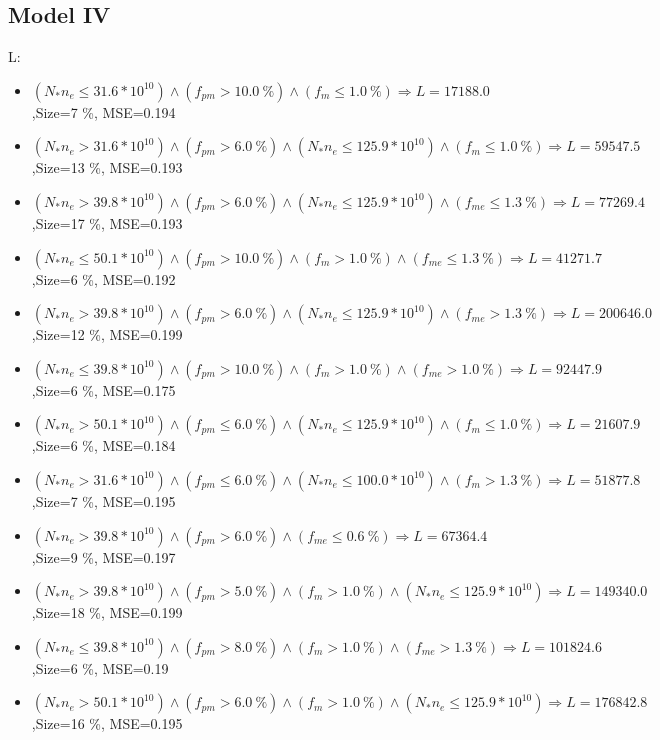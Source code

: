 \documentclass[numbered]{CSL}
\begin{document}
\subsection{Model IV}
L:
\begin{itemize}
\item $(N_* n_e \leq 31.6 * 10^{10}) \land (f_{pm} > 10.0~\%) \land (f_m \leq 1.0~\%) \Rightarrow L = 17188.0$,\hfill Size=7 \%, MSE=0.194
\item $(N_* n_e > 31.6 * 10^{10}) \land (f_{pm} > 6.0~\%) \land (N_* n_e \leq 125.9 * 10^{10}) \land (f_m \leq 1.0~\%) \Rightarrow L = 59547.5$,\hfill Size=13 \%, MSE=0.193
\item $(N_* n_e > 39.8 * 10^{10}) \land (f_{pm} > 6.0~\%) \land (N_* n_e \leq 125.9 * 10^{10}) \land (f_{me} \leq 1.3~\%) \Rightarrow L = 77269.4$,\hfill Size=17 \%, MSE=0.193
\item $(N_* n_e \leq 50.1 * 10^{10}) \land (f_{pm} > 10.0~\%) \land (f_m > 1.0~\%) \land (f_{me} \leq 1.3~\%) \Rightarrow L = 41271.7$,\hfill Size=6 \%, MSE=0.192
\item $(N_* n_e > 39.8 * 10^{10}) \land (f_{pm} > 6.0~\%) \land (N_* n_e \leq 125.9 * 10^{10}) \land (f_{me} > 1.3~\%) \Rightarrow L = 200646.0$,\hfill Size=12 \%, MSE=0.199
\item $(N_* n_e \leq 39.8 * 10^{10}) \land (f_{pm} > 10.0~\%) \land (f_m > 1.0~\%) \land (f_{me} > 1.0~\%) \Rightarrow L = 92447.9$,\hfill Size=6 \%, MSE=0.175
\item $(N_* n_e > 50.1 * 10^{10}) \land (f_{pm} \leq 6.0~\%) \land (N_* n_e \leq 125.9 * 10^{10}) \land (f_m \leq 1.0~\%) \Rightarrow L = 21607.9$,\hfill Size=6 \%, MSE=0.184
\item $(N_* n_e > 31.6 * 10^{10}) \land (f_{pm} \leq 6.0~\%) \land (N_* n_e \leq 100.0 * 10^{10}) \land (f_m > 1.3~\%) \Rightarrow L = 51877.8$,\hfill Size=7 \%, MSE=0.195
\item $(N_* n_e > 39.8 * 10^{10}) \land (f_{pm} > 6.0~\%) \land (f_{me} \leq 0.6~\%) \Rightarrow L = 67364.4$,\hfill Size=9 \%, MSE=0.197
\item $(N_* n_e > 39.8 * 10^{10}) \land (f_{pm} > 5.0~\%) \land (f_m > 1.0~\%) \land (N_* n_e \leq 125.9 * 10^{10}) \Rightarrow L = 149340.0$,\hfill Size=18 \%, MSE=0.199
\item $(N_* n_e \leq 39.8 * 10^{10}) \land (f_{pm} > 8.0~\%) \land (f_m > 1.0~\%) \land (f_{me} > 1.3~\%) \Rightarrow L = 101824.6$,\hfill Size=6 \%, MSE=0.19
\item $(N_* n_e > 50.1 * 10^{10}) \land (f_{pm} > 6.0~\%) \land (f_m > 1.0~\%) \land (N_* n_e \leq 125.9 * 10^{10}) \Rightarrow L = 176842.8$,\hfill Size=16 \%, MSE=0.195

\end{itemize}
\end{document}
